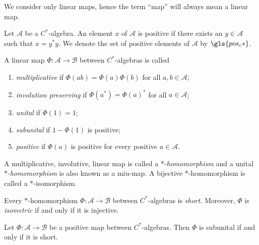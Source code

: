 We consider only linear maps, hence the term ``map'' will always mean a linear map.


\begin{definition}
  Let $ \mathscr{A}$ be a \( C^* \)-algebra. An element $x$ of $ \mathscr{A}$ is  positive if there exists an $y \in  \mathscr{A}$ such that $x = y^* y$.
  We denote the set of positive elements of $ \mathscr{A}$ by $ \gls{pos_c*}$.
\end{definition}


\begin{definition}
 A linear map $\Phi: \mathscr{A} \to \mathscr{B}$ between $C^*$-algebras is called
\begin{enumerate}
    \item \emph{multiplicative} if $\Phi(ab) = \Phi(a)\Phi(b)$ for all $a, b \in \mathscr{A} $;
    \item \emph{involution preserving} if $\Phi(a^*) = \Phi(a)^*$ for all $a \in \mathscr{A} $;
    \item \emph{unital} if $\Phi(1) = 1$;
    \item \emph{subunital} if $1-\Phi(1)$ is positive;
    \item \emph{positive} if $\Phi(a)$ is positive for every positive $a \in \mathscr{A} $.
\end{enumerate}
A multiplicative, involutive, linear map is called a \(*\)-\emph{homomorphism} and a unital \(*\)-\emph{homomorphism} is also known as a \acrshort{miu}-map. A bijective \(*\)-homomorphism is called a \(*\)-isomorphism.
\end{definition}

\begin{proposition} \cite[Theorem 1.5.7]{pedersenCalgebrasTheirAutomorphism1979} \label{prop:HomShortIsoIso}
  Every \(*\)-homomorphism \( \Phi: \mathscr{A} \to \mathscr{B} \) between \( C^* \)-algebras is \emph{short}. Moreover, \( \Phi \) is \emph{isometric} if and only if it is injective.
\end{proposition}

\begin{proposition} \cite[Proposition 2.4]{choSemanticsQuantumProgramming2016} \label{prop:subunital_short}
Let \( \Phi: \mathscr{A} \to \mathscr{B} \) be a positive map between \( C^* \)-algebras. Then \( \Phi \) is subunital if and only if it is short.
\end{proposition}


